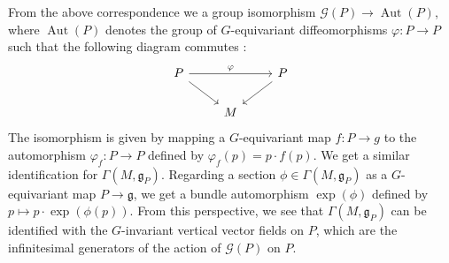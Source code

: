 \documentclass[psamsfonts, 12pt]{amsart}
\theoremstyle{definition}
\theoremstyle{remark}
\newcommand{\g}{\mathfrak{g}}
\DeclareMathOperator{\Aut}{Aut}
\begin{document}
%
From the above correspondence we a group isomorphism
$\mathscr{G}(P) \to \Aut(P)$, where $\Aut(P)$ denotes the group of
$G$-equivariant diffeomorphisms $\varphi : P \to P$ such that
the following diagram commutes :
\[\begin{tikzcd}
P \ar[dr] \ar[rr, "\varphi"] && P \ar[dl] \\
& M
\end{tikzcd}\]
The isomorphism is given by mapping a $G$-equivariant map $f : P \to g$
to the automorphism $\varphi_f : P \to P$ defined by $\varphi_f(p) = p\cdot f(p)$.
We get a similar identification for $\Gamma(M, \g_P)$. Regarding a section
$\phi \in \Gamma(M,\g_P)$ as a $G$-equivariant map $P \to \g$, we get
a bundle automorphism $\exp(\phi)$ defined by $p\mapsto p\cdot\exp(\phi(p))$. From
this perspective, we see that $\Gamma(M,\g_P)$ can be identified with the $G$-invariant
vertical vector fields on $P$, which are the infinitesimal generators of the action
of $\mathscr{G}(P)$ on $P$. \\
\end{document}
